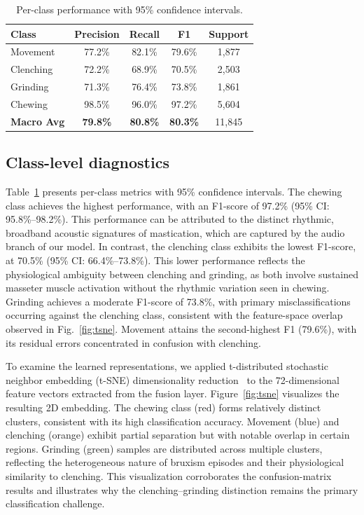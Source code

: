 \documentclass[pdflatex,sn-nature,iicol]{sn-jnl}
\begin{document}
\begin{table}[t]
  \vspace{2.5em} %

  \caption{Per-class performance with 95\% confidence intervals.}
  \label{tab:perclass}
  \begin{tabular}{lcccc}
    \toprule
    Class & Precision & Recall & F1 & Support \\
    \midrule
    Movement & 77.2\% & 82.1\% & 79.6\% & 1,877 \\
    Clenching & 72.2\% & 68.9\% & 70.5\% & 2,503 \\
    Grinding & 71.3\% & 76.4\% & 73.8\% & 1,861 \\
    Chewing & 98.5\% & 96.0\% & 97.2\% & 5,604 \\
    \midrule
    \textbf{Macro Avg} & \textbf{79.8\%} & \textbf{80.8\%} & \textbf{80.3\%} & 11,845 \\
    \bottomrule
  \end{tabular}
\end{table}


\subsection{Class-level diagnostics}

Table~\ref{tab:perclass} presents per-class metrics with 95\% confidence intervals. The chewing class achieves the highest performance, with an F1-score of 97.2\% (95\% CI: 95.8\%--98.2\%). This performance can be attributed to the distinct rhythmic, broadband acoustic signatures of mastication, which are captured by the audio branch of our model. In contrast, the clenching class exhibits the lowest F1-score, at 70.5\% (95\% CI: 66.4\%--73.8\%). This lower performance reflects the physiological ambiguity between clenching and grinding, as both involve sustained masseter muscle activation without the rhythmic variation seen in chewing. Grinding achieves a moderate F1-score of 73.8\%, with primary misclassifications occurring against the clenching class, consistent with the feature-space overlap observed in Fig.~\ref{fig:tsne}. Movement attains the second-highest F1 (79.6\%), with its residual errors concentrated in confusion with clenching.

To examine the learned representations, we applied t-distributed stochastic neighbor embedding (t-SNE) dimensionality reduction~\cite{vandermaaten2008visualizing} to the 72-dimensional feature vectors extracted from the fusion layer. Figure~\ref{fig:tsne} visualizes the resulting 2D embedding. The chewing class (red) forms relatively distinct clusters, consistent with its high classification accuracy. Movement (blue) and clenching (orange) exhibit partial separation but with notable overlap in certain regions. Grinding (green) samples are distributed across multiple clusters, reflecting the heterogeneous nature of bruxism episodes and their physiological similarity to clenching. This visualization corroborates the confusion-matrix results and illustrates why the clenching--grinding distinction remains the primary classification challenge.
\end{document}
